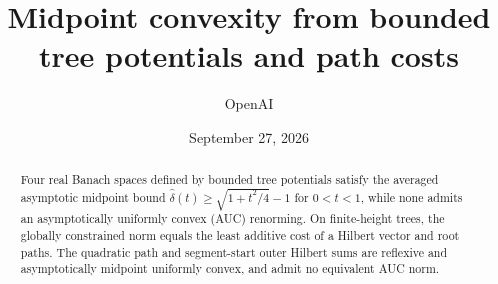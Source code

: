 \documentclass[11pt]{article}
\title{Midpoint convexity from bounded tree potentials and path costs}
\author{OpenAI}
\date{September 27, 2026}
\theoremstyle{remark}
\begin{document}
\maketitle
\begin{abstract}
Four real Banach spaces defined by bounded tree potentials satisfy the
averaged asymptotic midpoint bound $\widehat\delta(t)\ge\sqrt{1+t^2/4}-1$
for $0<t<1$, while none admits an asymptotically uniformly convex
(AUC) renorming. On finite-height trees, the globally constrained norm
equals the least additive cost of a Hilbert vector and root paths.
The quadratic path and segment-start outer Hilbert sums are reflexive
and asymptotically midpoint uniformly convex, and admit no equivalent
AUC norm.
\end{abstract}









\end{document}
